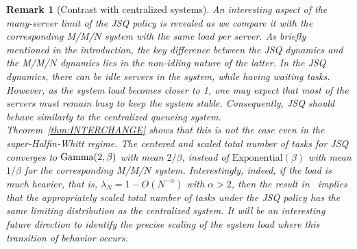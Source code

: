 \documentclass[11pt, reqno]{article}
\DeclarePairedDelimiter\autobracket{(}{)}
\newcommand{\br}[1]{\autobracket*{#1}}
\newtheorem{remark}[theorem]{Remark}
\numberwithin{equation}{section}
\numberwithin{theorem}{section}
\newcommand{\newGamma}{\mathrm{Gamma}}
\newcommand{\E}{\mathbb{E}}                 %
\begin{document}

\begin{remark}[Contrast with centralized systems]
An interesting aspect of the many-server limit of the JSQ policy is revealed as we compare it with the corresponding M/M/$N$ system with the same load per server.
As briefly mentioned in the introduction, the key difference between the JSQ dynamics and the M/M/$N$ dynamics lies in the non-idling nature of the latter.
In the JSQ dynamics, there can be idle servers in the system, while having waiting tasks. 
However, as the system load becomes closer to 1, 
one may expect that most of the servers must remain busy to keep the system stable. 
Consequently, JSQ should behave similarly to the centralized queueing system. 
Theorem~\ref{thm:INTERCHANGE} shows that this is not the case even in the super-Halfin-Whitt regime. The centered and scaled total number of tasks for JSQ converges to $\newGamma\br{2,\beta}$ with mean $2/\beta$, instead of $\mathrm{Exponential}(\beta)$ with mean $1/\beta$ for the corresponding M/M/$N$ system.
Interestingly, indeed, if the load is much heavier, that is, $\lambda_N = 1 - O(N^{-\alpha})$ with $\alpha>2$, then the result in~\cite{HM21} implies that the appropriately scaled total number of tasks under the JSQ policy has the same limiting distribution as the centralized system.
It will be an interesting future direction to identify the precise scaling of the system load where this transition of behavior occurs.
\end{remark}
\end{document}

